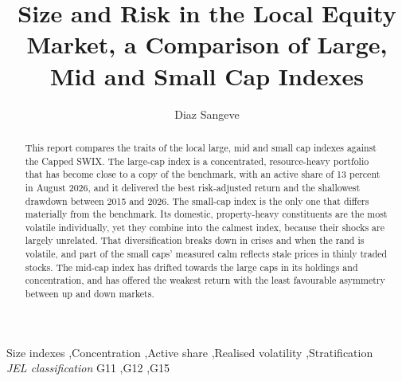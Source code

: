 \documentclass[11pt,preprint]{elsarticle}
\numberwithin{equation}{section}
\numberwithin{figure}{section}
\numberwithin{table}{section}
\begin{document}
\begin{frontmatter}  %

\title{Size and Risk in the Local Equity Market, a Comparison of Large,
Mid and Small Cap Indexes}





\author[Add1]{Diaz Sangeve}





\address[Add1]{Stellenbosch University, Stellenbosch, South Africa}


\begin{abstract}
\small{
This report compares the traits of the local large, mid and small cap
indexes against the Capped SWIX. The large-cap index is a concentrated,
resource-heavy portfolio that has become close to a copy of the
benchmark, with an active share of 13 percent in August 2026, and it
delivered the best risk-adjusted return and the shallowest drawdown
between 2015 and 2026. The small-cap index is the only one that differs
materially from the benchmark. Its domestic, property-heavy constituents
are the most volatile individually, yet they combine into the calmest
index, because their shocks are largely unrelated. That diversification
breaks down in crises and when the rand is volatile, and part of the
small caps' measured calm reflects stale prices in thinly traded stocks.
The mid-cap index has drifted towards the large caps in its holdings and
concentration, and has offered the weakest return with the least
favourable asymmetry between up and down markets.
}
\end{abstract}

\vspace{1cm}


\begin{keyword}
\footnotesize{
Size indexes \sep Concentration \sep Active share \sep Realised
volatility \sep Stratification \\
\vspace{0.3cm}
}
\footnotesize{
\textit{JEL classification} G11 \sep G12 \sep G15
}
\end{keyword}



\vspace{0.5cm}

\end{frontmatter}
\end{document}
